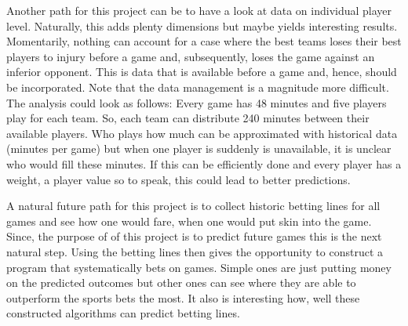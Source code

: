 \documentclass[11pt, a4paper, leqno]{article}
\begin{document}
Another path for this project can be to have a look at data on individual player level. Naturally, this adds plenty dimensions but maybe yields interesting results. Momentarily, nothing can account for a case where the best teams loses their best players to injury before a game and, subsequently, loses the game against an inferior opponent. This is data that is available before a game and, hence, should be incorporated. Note that the data management is a magnitude more difficult. The analysis could look as follows: Every game has 48 minutes and five players play for each team. So, each team can distribute 240 minutes between their available players. Who plays how much can be approximated with historical data (minutes per game) but when one player is suddenly is unavailable, it is unclear who would fill these minutes. If this can be efficiently done and every player has a weight, a player value so to speak, this could lead to better predictions.

A natural future path for this project is to collect historic betting lines for all games and see how one would fare, when one would put skin into the game. Since, the purpose of of this project is to predict future games this is the next natural step. Using the betting lines then gives the opportunity to construct a program that systematically bets on games. Simple ones are just putting money on the predicted outcomes but other ones can see where they are able to outperform the sports bets the most. It also is interesting how, well these constructed algorithms can predict betting lines.





\end{document}
